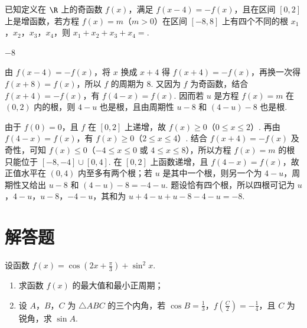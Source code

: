 \begin{problem}
已知定义在 \(\R\) 上的奇函数 \(f(x)\)，满足 \(f(x - 4) = -f(x)\)，且在区间 \([0, 2]\) 上是增函数，若方程 \(f(x) = m\)（\(m > 0\)）在区间 \([-8, 8]\) 上有四个不同的根 \(x_1\)，\(x_2\)，\(x_3\)，\(x_4\)，则 \(x_1 + x_2 + x_3 + x_4 = \)\fillinblank{}.
\end{problem}

\begin{answer}
\(-8\)
\end{answer}

\begin{solution}
由 \(f(x-4)=-f(x)\)，将 \(x\) 换成 \(x+4\) 得 \(f(x+4)=-f(x)\)，再换一次得 \(f(x+8)=f(x)\)，所以 \(f\) 的周期为 \(8\). 又因为 \(f\) 为奇函数，结合 \(f(x+4)=-f(x)\)，有 \(f(4-x)=f(x)\). 因而若 \(u\) 是方程 \(f(x)=m\) 在 \((0,2)\) 内的根，则 \(4-u\) 也是根，且由周期性 \(u-8\) 和 \((4-u)-8\) 也是根.

由于 \(f(0)=0\)，且 \(f\) 在 \([0,2]\) 上递增，故 \(f(x)\geqslant0\)（\(0\leqslant x\leqslant2\)）. 再由 \(f(4-x)=f(x)\)，有 \(f(x)\geqslant0\)（\(2\leqslant x\leqslant4\)）. 结合 \(f(x+4)=-f(x)\) 及奇性，可知 \(f(x)\leqslant0\)（\(-4\leqslant x\leqslant0\) 或 \(4\leqslant x\leqslant8\)），所以方程 \(f(x)=m\) 的根只能位于 \([-8,-4]\cup[0,4]\). 在 \([0,2]\) 上函数递增，且 \(f(4-x)=f(x)\)，故正值水平在 \((0,4)\) 内至多有两个根；若 \(u\) 是其中一个根，则另一个为 \(4-u\)，周期性又给出 \(u-8\) 和 \((4-u)-8=-4-u\). 题设恰有四个根，所以四根可记为 \(u\)，\(4-u\)，\(u-8\)，\(-4-u\)，其和为 \(u+4-u+u-8-4-u=-8\).
\end{solution}

\section{解答题}

\begin{problem}
设函数 \( f(x) = \cos \left(2x + \frac{\pi}{3}\right) + \sin^2 x \).

\begin{enumerate}
\item 求函数 \( f(x) \) 的最大值和最小正周期；
\item 设 \(A\)，\(B\)，\(C\) 为 \(\triangle ABC\) 的三个内角，若 \(\cos B = \frac{1}{3}\)，\(f\left(\frac{C}{2}\right) = -\frac{1}{4}\)，且 \(C\) 为锐角，求 \(\sin A\).
\end{enumerate}
\end{problem}

